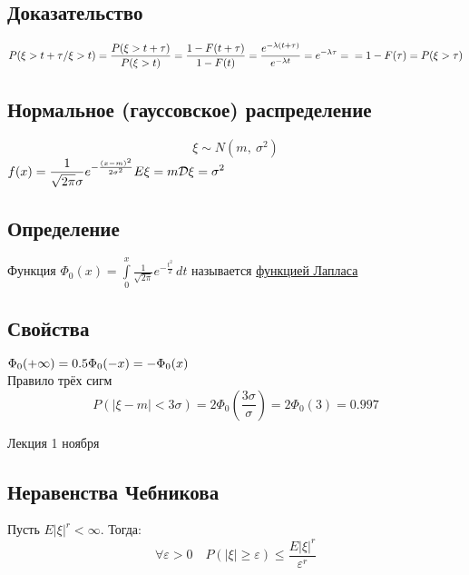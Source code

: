 \documentclass[12pt, a4paper]{article}
\begin{document}
    \subsection*{Доказательство}
    $\displaystyle P(\xi > t + \tau / \xi > t) = \frac{P(\xi > t + \tau)}{P(\xi > t)} = \frac{1 - F(t + \tau)}{1 - F(t)} = \frac{e^{-\lambda(t + \tau)}}{e^{-\lambda t}} = e^{-\lambda \tau} =\\
    = 1 - F(\tau) = P(\xi > \tau)$
    \subsection*{Нормальное (гауссовское) распределение}
    \[\xi \sim N(m,\ \sigma^2)\]
    $f(x) = \displaystyle\frac{1}{\sqrt{2\pi}\sigma} e^{-\frac{(x - m)^2}{2\sigma^2}}\\
    E\xi = m\\
    \mathcal{D}\xi = \sigma^2$
    \subsection*{Определение}
    Функция $\Phi_0(x) = \displaystyle \int\limits_{0}^{x} \frac{1}{\sqrt{2\pi}}e^{-\frac{t^2}{2}}\, dt$ называется \underline{функцией Лапласа}
    \subsection*{Свойства}
    $\Phi_0 (+\infty) = 0.5\\
    \Phi_0(-x) = -\Phi_0(x)$\\
    Правило трёх сигм
    \[P(|\xi - m| < 3\sigma) = 2\Phi_0\left( \frac{3\sigma}{\sigma} \right) = 2\Phi_0(3) = 0.997\]
    \begin{center}
        Лекция 1 ноября
    \end{center}
    \subsection*{Неравенства Чебникова}
    Пусть $E|\xi|^r < \infty$. Тогда:
    \[\forall \varepsilon > 0\quad P(|\xi| \geq \varepsilon) \leq \frac{E|\xi|^r}{\varepsilon^r}\]
\end{document}
